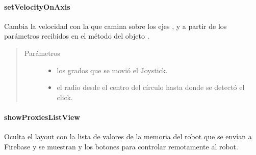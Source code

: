 \paragraph{setVelocityOnAxis}
\label{\detokenize{dev_docs:setvelocityonaxis}}

\begin{fulllineitems}
\label{\detokenize{dev_docs:com.lar.cloudnao.RemoteControllerActivity.setVelocityOnAxis(int, float)}}
Cambia la velocidad con la que camina sobre los ejes , y  a partir de los parámetros recibidos en el método {\hyperref[\detokenize{dev_docs:com.lar.cloudnao.RemoteControllerActivity.setMyJoystickListener()}]{}} del objeto {\hyperref[\detokenize{dev_docs:com.lar.cloudnao.RemoteControllerActivity.mJoystick}]{}}.
\begin{quote}\begin{description}
\item[{Parámetros}] \leavevmode\begin{itemize}
\item {} 
 \textendash{} los grados que se movió el Joystick.

\item {} 
 \textendash{} el radio desde el centro del círculo hasta donde se detectó el click.

\end{itemize}

\end{description}\end{quote}

\end{fulllineitems}



\paragraph{showProxiesListView}
\label{\detokenize{dev_docs:showproxieslistview}}

\begin{fulllineitems}
\label{\detokenize{dev_docs:com.lar.cloudnao.RemoteControllerActivity.showProxiesListView()}}
Oculta el layout con la lista de valores de la memoria del robot que se envían a Firebase y se muestran {\hyperref[\detokenize{dev_docs:com.lar.cloudnao.RemoteControllerActivity.mLiveImageFromRobot}]{}} y los botones para controlar remotamente al robot.

\end{fulllineitems}



